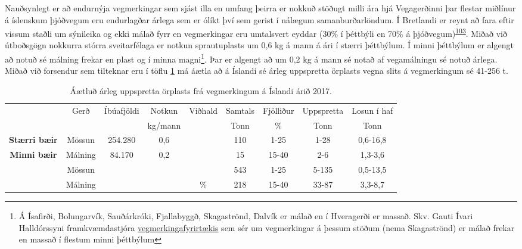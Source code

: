 \documentclass[icelandic,]{book}
\let\rmarkdownfootnote\footnote%
\def\footnote{\protect\rmarkdownfootnote}
\begin{document}
Nauðsynlegt er að endurnýja vegmerkingar sem sjást illa en umfang þeirra er nokkuð stöðugt milli ára hjá Vegagerðinni þar flestar miðlínur á íslenskum þjóðvegum eru endurlagðar árlega sem er ólíkt því sem gerist í nálægum samanburðarlöndum. Í Bretlandi er reynt að fara eftir vissum staðli um sýnileika og ekki málað fyrr en vegmerkingar eru umtalsvert eyddar (30\% í þéttbýli en 70\% á þjóðvegum)\textsuperscript{\protect\hyperlink{ref-Hann2018}{103}}. Miðað við útboðsgögn nokkurra stórra sveitarfélaga er notkun sprautuplasts um 0,6 kg á mann á ári í stærri þéttbýlum. Í minni þéttbýlum er algengt að notuð sé málning frekar en plast og í minna magni\footnote{Á Ísafirði, Bolungarvík, Sauðárkróki, Fjallabyggð, Skagaströnd, Dalvík er málað en í Hveragerði er massað. Skv. Gauti Ívari Halldórssyni framkvæmdastjóra \href{http://www.bilastaedamalun.is/}{vegmerkingafyrirtækis} sem sér um vegmerkingar á þessum stöðum (nema Skagaströnd) er málað frekar en massað í flestum minni þéttbýlum}. Þar er algengt að um 0,2 kg á mann sé notað af vegamálningu sé notuð árlega. Miðað við forsendur sem tilteknar eru í töflu \ref{tab:vegmerkingar} má áætla að á Íslandi sé árleg uppspretta örplasts vegna slits á vegmerkingum sé 41-256 t.

\begin{table}[t]

\caption{\label{tab:vegmerkingar}Áætluð árleg uppspretta örplasts frá vegmerkingum á Íslandi árið 2017.}
\centering
\fontsize{7}{9}\selectfont
\begin{tabular}{>{\bfseries}ccccccccc}
\toprule
\multicolumn{1}{c}{} & \multicolumn{1}{c}{Gerð} & \multicolumn{1}{c}{Íbúafjöldi} & \multicolumn{1}{c}{Notkun} & \multicolumn{1}{c}{Viðhald} & \multicolumn{1}{c}{Samtals} & \multicolumn{1}{c}{Fjölliður } & \multicolumn{1}{c}{Uppspretta} & \multicolumn{1}{c}{Losun í haf} \\
\cmidrule(l{3pt}r{3pt}){2-2} \cmidrule(l{3pt}r{3pt}){3-3} \cmidrule(l{3pt}r{3pt}){4-4} \cmidrule(l{3pt}r{3pt}){5-5} \cmidrule(l{3pt}r{3pt}){6-6} \cmidrule(l{3pt}r{3pt}){7-7} \cmidrule(l{3pt}r{3pt}){8-8} \cmidrule(l{3pt}r{3pt}){9-9}
 &  &  & kg/mann &  & Tonn & \% & Tonn & Tonn\\
\midrule
Stærri bæir & Mössun & 254.280 & 0,6 &  & 110 & 1-25 & 1-28 & 0,6-16,8\\
\cmidrule{1-4}
\cmidrule{6-9}
Minni bæir & Málning & 84.170 & 0,2 &  & 15 & 15-40 & 2-6 & 1,3-3,6\\
\cmidrule{1-4}
\cmidrule{6-9}
 & Mössun &  &  &  & 543 & 1-25 & 5-135 & 0,5-13,5\\
\cmidrule{2-2}
\cmidrule{6-9}
\multirow{-2}{*}{\centering\arraybackslash Vegagerðin} & Málning & \multirow{-2}{*}{\centering\arraybackslash } & \multirow{-2}{*}{\centering\arraybackslash } & \multirow{-4}{*}{\centering\arraybackslash 87\%} & 218 & 15-40 & 33-87 & 3,3-8,7\\
\bottomrule
\end{tabular}
\end{table}
\end{document}
